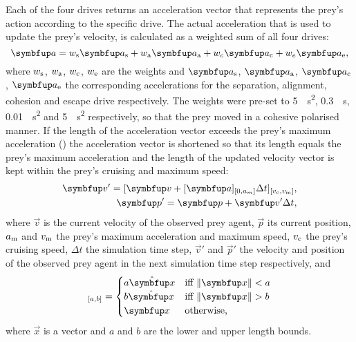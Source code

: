 Each of the four drives returns an acceleration vector that represents the prey's action according to the specific drive. The actual acceleration that is used to update the prey's velocity, is calculated as a weighted sum of all four drives:
%
\begin{equation}
\vec{a}=w_\textnormal{s}\vec{a}_\textnormal{s}+w_\textnormal{a}\vec{a}_\textnormal{a}+w_c\vec{a}_\textnormal{c}+w_e\vec{a}_\textnormal{e},
\end{equation}
%
where $w_\textnormal{s}$, $w_\textnormal{a}$, $w_\textnormal{c}$, $w_\textnormal{e}$ are the weights and $\vec{a}_\textnormal{s}$, $\vec{a}_\textnormal{a}$, $\vec{a}_\textnormal{c}$, $\vec{a}_\textnormal{e}$ the corresponding accelerations for the separation, alignment, cohesion and escape drive respectively. The weights were pre-set to \SI{5}{\per\second\squared}, \SI{0.3}{\per\second}, \SI{0.01}{\per\second\squared} and \SI{5}{\per\second\squared} respectively, so that the prey moved in a cohesive polarised manner. If the length of the acceleration vector exceeds the prey's maximum acceleration () the acceleration vector is shortened so that its length equals the prey's maximum acceleration and the length of the updated velocity vector is kept within the prey's cruising and maximum speed:
%
\begin{eqnarray}
\vec{v}'=[\vec{v}+[\vec{a}]_{[0,a_m]}\Delta t]_{[v_\textnormal{c},v_\textnormal{m}]},\\
\label{eq:v}
\vec{p}'= \vec{p} + \vec{v}'\Delta t,
\end{eqnarray}
%
where $\vec{v}$ is the current velocity of the observed prey agent, $\vec{p}$ its current position, $a_\textnormal{m}$ and $v_\textnormal{m}$ the prey's maximum acceleration and maximum speed, $v_\textnormal{c}$ the prey's cruising speed, $\Delta t$ the simulation time step, $\vec{v}'$ and $\vec{p}'$ the velocity and position of the observed prey agent in the next simulation time step respectively, and
%
\begin{equation}
[\vec{x}]_{[a,b]}=\begin{cases}
a\uvec{x} & \textnormal{iff}\ \|\vec{x}\| < a \\
b\uvec{x} & \textnormal{iff}\ \|\vec{x}\| > b \\
\vec{x} & \textnormal{otherwise,}
\end{cases}
\end{equation}
%
where $\vec{x}$ is a vector and $a$ and $b$ are the lower and upper length bounds.

